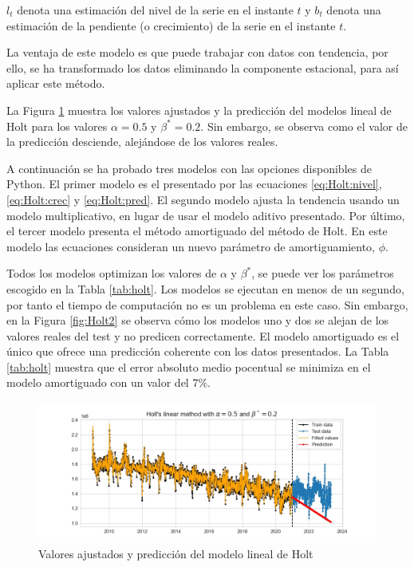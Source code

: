 \documentclass[12pt,twoside]{article}
\begin{document}
$l_t$ denota una estimación del nivel de la serie en el instante $t$ y $b_t$ denota una estimación de la pendiente (o crecimiento) de la serie en el instante $t$.


La ventaja de este modelo es que puede trabajar con datos con tendencia, por ello, se ha transformado los datos eliminando la componente estacional, para así aplicar este método.

La Figura \ref{fig:Holt1} muestra los valores ajustados y la predicción del modelos lineal de Holt para los valores $\alpha=0.5$ y $\beta^* = 0.2$. Sin embargo, se observa como el valor de la predicción desciende, alejándose de los valores reales.

A continuación se ha probado tres modelos con las opciones disponibles de Python. El primer modelo es el presentado por las ecuaciones \eqref{eq:Holt:nivel}, \eqref{eq:Holt:crec} y \eqref{eq:Holt:pred}. El segundo modelo ajusta la tendencia usando un modelo multiplicativo, en lugar de usar el modelo aditivo presentado. Por último, el tercer modelo presenta el método amortiguado del método de Holt. En este modelo las ecuaciones consideran un nuevo parámetro de amortiguamiento, $\phi$.

Todos los modelos optimizan los valores de $\alpha$ y $\beta^*$, se puede ver los parámetros escogido en la Tabla \ref{tab:holt}. Los modelos se ejecutan en menos de un segundo, por tanto el tiempo de computación no es un problema en este caso. Sin embargo, en la Figura \ref{fig:Holt2} se observa cómo los modelos uno y dos se alejan de los valores reales del test y no predicen correctamente. El modelo amortiguado es el único que ofrece una predicción coherente con los datos presentados. La Tabla \ref{tab:holt} muestra que el error absoluto medio pocentual se minimiza en el modelo amortiguado con un valor del $7\%$.




\begin{figure}[h]
    \centering
    \includegraphics[width = \textwidth]{imagenes/Holt1.jpg}
    \caption{Valores ajustados y predicción del modelo lineal de Holt}\label{fig:Holt1}
\end{figure}
\end{document}
